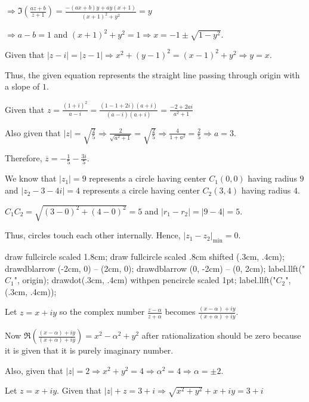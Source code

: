   $\Rightarrow \Im\left(\frac{az + b}{z + 1}\right) = \frac{-(ax + b)y + ay(x + 1)}{(x + 1)^2 + y^2} = y$

  $\Rightarrow a - b = 1$ and $(x + 1)^2 + y^2 = 1\Rightarrow x = -1\pm\sqrt{1 - y^2}$.
\item Given that $|z - i| = |z - 1|\Rightarrow x^2 + (y - 1)^2 = (x - 1)^2 + y^2\Rightarrow y = x$.

  Thus, the given equation represents the straight line passing through origin with a slope of $1$.
\item Given that $z = \frac{(1 + i)^2}{a - i} = \frac{(1 - 1 + 2i)(a + i)}{(a - i)(a + i)} = \frac{-2 +
  2ai}{a^2 + 1}$

  Also given that $|z| = \sqrt{\frac{2}{5}}\Rightarrow \frac{2}{\sqrt{a^2 + 1}} =
  \sqrt{\frac{2}{5}}\Rightarrow \frac{4}{1 + a^2} = \frac{2}{5}\Rightarrow a = 3$.

  Therefore, $\overline{z} = -\frac{1}{5} - \frac{3i}{5}$.
\item We know that $|z_1| = 9$ represents a circle having center $C_1(0, 0)$ having radius $9$ and $|z_2 - 3
  - 4i| = 4$ represents a circle having center $C_2(3, 4)$ having radius $4$.

  $C_1C_2 = \sqrt{(3 - 0)^2 + (4 - 0)^2} = 5$ and $|r_1 - r_2| = |9 - 4| = 5$.

  Thus, circles touch each other internally. Hence, $|z_1 - z_2|_{\mathrm{min}} = 0$.

  \startplacefigure[location=force]
    \startMPcode
      draw fullcircle scaled 1.8cm;
      draw fullcircle scaled .8cm shifted (.3cm, .4cm);
      drawdblarrow (-2cm, 0) -- (2cm, 0);
      drawdblarrow (0, -2cm) -- (0, 2cm);
      label.llft("$C_1$", origin);
      drawdot(.3cm, .4cm) withpen pencircle scaled 1pt;
      label.llft("$C_2$", (.3cm, .4cm));
    \stopMPcode
  \stopplacefigure
\item Let $z = x + iy$ so the complex number $\frac{z - \alpha}{z + \alpha}$ becomes $\frac{(x - \alpha) +
  iy}{(x + \alpha) + iy}$.

  Now $\Re\left(\frac{(x - \alpha) + iy}{(x + \alpha) + iy}\right) = x^2 - \alpha^2 + y^2$ after
  rationalization should be zero because it is given that it is purely imaginary number.

  Also, given that $|z| = 2 \Rightarrow x^2 + y^2 = 4 \Rightarrow \alpha^2 = 4 \Rightarrow \alpha = \pm 2$.
\item Let $z = x + iy$. Given that $|z| + z = 3 + i \Rightarrow \sqrt{x^2 + y^2} + x + iy = 3 + i$

